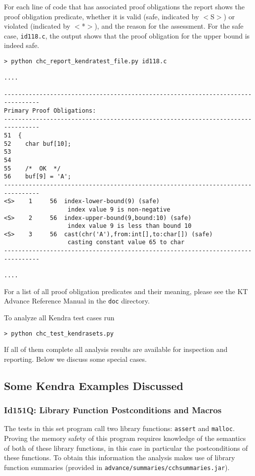 \documentclass[11pt]{article}
\begin{document}
For each line of code that has associated proof obligations the report shows the
proof obligation predicate, whether it is valid (safe, indicated by $<$S$>$) or 
violated (indicated by $<$*$>$), and the reason for the assessment. For the safe
case, {\tt id118.c}, the output shows that the proof obligation for the upper bound is
indeed safe.
\begin{small}
\begin{verbatim}
> python chc_report_kendratest_file.py id118.c

....

--------------------------------------------------------------------------------
Primary Proof Obligations:
--------------------------------------------------------------------------------
51  {
52    char buf[10];
53
54
55    /*  OK  */
56    buf[9] = 'A';
--------------------------------------------------------------------------------
<S>    1     56  index-lower-bound(9) (safe)
                  index value 9 is non-negative
<S>    2     56  index-upper-bound(9,bound:10) (safe)
                  index value 9 is less than bound 10
<S>    3     56  cast(chr('A'),from:int[],to:char[]) (safe)
                  casting constant value 65 to char
--------------------------------------------------------------------------------

....
\end{verbatim}
\end{small}




For a list of all proof obligation predicates and their meaning, please see the KT Advance
Reference Manual in the {\tt doc} directory.

To analyze all Kendra test cases run
\begin{verbatim}
> python chc_test_kendrasets.py
\end{verbatim}
If all of them complete all analysis results are available for inspection and reporting.
Below we discuss some special cases.

\subsection{Some Kendra Examples Discussed}

\subsubsection{Id151Q: Library Function Postconditions and Macros}

The tests in this set program call two library functions: {\tt assert} and {\tt malloc}. 
Proving the memory safety of this program requires knowledge of the semantics 
of both of these library functions, in this case in particular the postconditions 
of these functions. To obtain this information the analysis makes use of 
library function summaries (provided in {\tt advance/summaries/cchsummaries.jar}).
\end{document}
